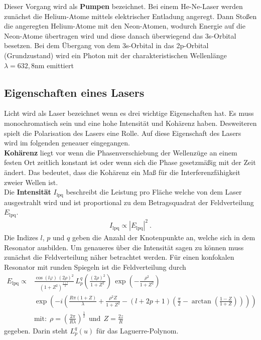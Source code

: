 Dieser Vorgang wird als \textbf{Pumpen} bezeichnet. Bei einem He-Ne-Laser werden zunächst die Helium-Atome mittels elektrischer Entladung angeregt. Dann Stoßen die angeregten Helium-Atome mit den Neon-Atomen, wodurch Energie auf die Neon-Atome übertragen wird und diese danach überwiegend das 3s-Orbital besetzen. Bei dem Übergang von dem 3s-Orbital in das 2p-Orbital (Grundzustand) wird ein Photon mit der charakteristischen Wellenlänge $\lambda = 632,8$nm emittiert


\subsection{Eigenschaften eines Lasers}
Licht wird als Laser bezeichnet wenn es drei wichtige Eigenschaften hat. Es muss monochromatisch sein und eine hohe Intensität und Kohärenz haben. Desweiteren spielt die Polarisation des Lasers eine Rolle. Auf diese Eigenschaft des Lasers wird im folgenden geneauer eingegangen. \\
\textbf{Kohärenz} liegt vor wenn die Phasenverschiebung der Wellenzüge an einem festen Ort zeitlich konstant ist oder wenn sich die Phase gesetzmäßig mit der Zeit ändert.
Das bedeutet, dass die Kohärenz ein Maß für die Interferenzfähigkeit zweier Wellen ist. \\
Die \textbf{Intensität} $I_\text{lpq}$ beschreibt die Leistung pro Fläche welche von dem Laser ausgestrahlt wird und ist proportional zu dem Betragsquadrat der Feldverteilung $E_\text{lpq}$.
\begin{align*}
	I_\text{lpq} \propto |E_\text{lpq}|^2 \ .
\end{align*}
Die Indizes $l$, $p$ und $q$ geben die Anzahl der Knotenpunkte an, welche sich in dem Resonator ausbilden. Um genaueres über die Intensität sagen zu können muss zunächst die Feldverteilung näher betrachtet werden. Für einen konfokalen Resonator mit runden Spiegeln ist die Feldverteilung durch
\begin{align*}
	E_\text{lpq} \propto &\frac{\cos(l\varphi)\,(2\rho)^2}{(1+Z^2)^\frac{1+l}{2}}\, L_p^q\left(\frac{(2\rho)^2}{1+Z^2}\right)\,\exp \left(-\frac{\rho^2}{1+Z^2} \right) \\
	&\exp \left(-i\left(\frac{R\pi(1+Z)}{\lambda}+ \frac{\rho^2Z}{1+Z^2}- (l+2p+1)\left(\frac{\pi}{2}-\arctan \left(\frac{1-Z}{1+Z} \right) \right)\right)\right) \\
	&\text{mit:}\ \ \rho = \left(\frac{2\pi}{R\lambda} \right)^\frac{1}{2} \ \ \text{und} \ \ Z = \frac{2z}{R}
\end{align*}
gegeben. Darin steht $L_p^q(u)$ für das Laguerre-Polynom. \\
